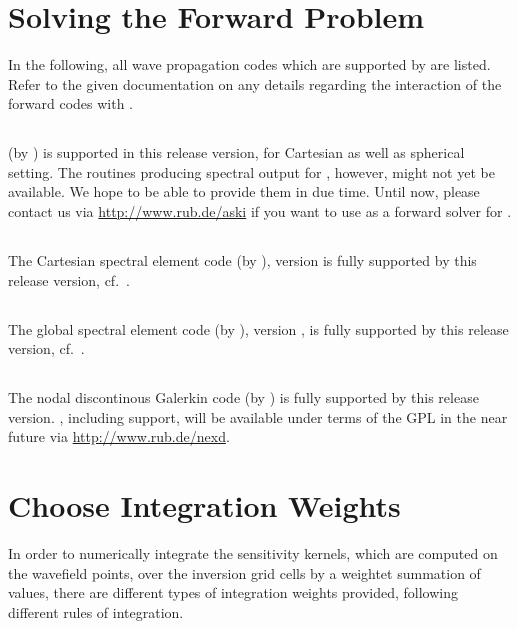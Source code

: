 \section{Solving the Forward Problem} \label{basic_steps,sec:forward_problem}
%
In the following, all wave propagation codes which are supported by \ASKI{} are listed.
Refer to the given documentation on any details regarding the interaction of the forward codes with \ASKI{}.
\subsection*{}
 (by \cite{friederich_wd1995}) is supported in this release version, for Cartesian as well as spherical setting. 
The  routines producing spectral output for \ASKI{}, however, might not yet be available. 
We hope to be able to provide them in due time. Until now, please contact us via \url{http://www.rub.de/aski}
if you want to use  as a forward solver for \ASKI{}.
\subsection*{}
The Cartesian spectral element code  (by \cite{TrKoLi08}), 
version  is fully supported by this \ASKI{} release version, cf.~\cite{Specfem3D_Cartesian_for_ASKI}.
\subsection*{}
The global spectral element code  (by \cite{TrKoLi08}), 
version , is fully supported by this \ASKI{} release version, cf.~\cite{Specfem3D_Globe_for_ASKI}.
\subsection*{}
The nodal discontinous Galerkin code  (by \cite{Lambrecht.2015}) is fully supported by this 
\ASKI{} release version. , including \ASKI{} support, will be available 
under terms of the GPL in the near future via \url{http://www.rub.de/nexd}.
%
\section{Choose Integration Weights} \label{basic_steps,sec:intw}
%
In order to numerically integrate the sensitivity kernels, which are computed on the wavefield points, 
over the inversion grid cells by a weightet summation of values, there are different 
types of integration weights provided, following different rules of integration.

